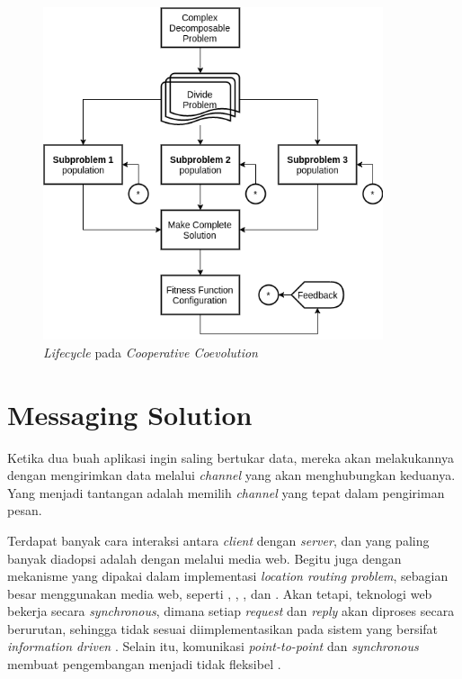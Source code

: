 \begin{figure}[!]
	\centering
	\includegraphics[width=10cm]{Resources/Images/coes_overview}
	\caption{\textit{Lifecycle} pada \textit{Cooperative Coevolution} \citep{de_oliveira_cooperative_2016}}
	\label{fig:coes_lifecycle}
\end{figure}


\section{Messaging Solution}
\label{sec:messaging-solution}


Ketika dua buah aplikasi ingin saling bertukar data, mereka akan melakukannya dengan mengirimkan data melalui \textit{channel} yang akan menghubungkan keduanya. Yang menjadi tantangan adalah memilih \textit{channel} yang tepat dalam pengiriman pesan.


Terdapat banyak cara interaksi antara \textit{client} dengan \textit{server}, dan yang paling banyak diadopsi adalah dengan melalui media web. Begitu juga dengan mekanisme yang dipakai dalam implementasi \textit{location routing problem}, sebagian besar menggunakan media web, seperti \citep{weise_solving_2009}, \citep{sengoku_fast_1998}, \citep{sarmenta_bayanihan_2002}, dan \citep{diaz_vrp_2012}. Akan tetapi, teknologi web bekerja secara \textit{synchronous}, dimana setiap \textit{request} dan \textit{reply} akan diproses secara berurutan, sehingga tidak sesuai diimplementasikan pada sistem yang bersifat \textit{information driven} \citep{muhl_large-scale_2002}. Selain itu, komunikasi \textit{point-to-point} dan \textit{synchronous} membuat pengembangan menjadi tidak fleksibel \citep{eugster_many_2003}.


